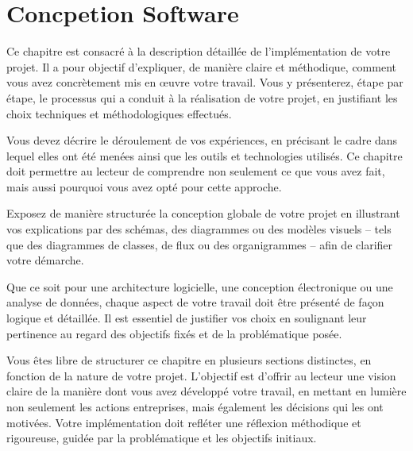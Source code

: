 \chapter{Concpetion Software}

Ce chapitre est consacré à la description détaillée de l'implémentation de votre projet. Il a pour objectif d'expliquer, de manière claire et méthodique, comment vous avez concrètement mis en œuvre votre travail. Vous y présenterez, étape par étape, le processus qui a conduit à la réalisation de votre projet, en justifiant les choix techniques et méthodologiques effectués.

Vous devez décrire le déroulement de vos expériences, en précisant le cadre dans lequel elles ont été menées ainsi que les outils et technologies utilisés. Ce chapitre doit permettre au lecteur de comprendre non seulement ce que vous avez fait, mais aussi pourquoi vous avez opté pour cette approche.

Exposez de manière structurée la conception globale de votre projet en illustrant vos explications par des schémas, des diagrammes ou des modèles visuels -- tels que des diagrammes de classes, de flux ou des organigrammes -- afin de clarifier votre démarche.

Que ce soit pour une architecture logicielle, une conception électronique ou une analyse de données, chaque aspect de votre travail doit être présenté de façon logique et détaillée. Il est essentiel de justifier vos choix en soulignant leur pertinence au regard des objectifs fixés et de la problématique posée.

Vous êtes libre de structurer ce chapitre en plusieurs sections distinctes, en fonction de la nature de votre projet. L'objectif est d'offrir au lecteur une vision claire de la manière dont vous avez développé votre travail, en mettant en lumière non seulement les actions entreprises, mais également les décisions qui les ont motivées. Votre implémentation doit refléter une réflexion méthodique et rigoureuse, guidée par la problématique et les objectifs initiaux.
